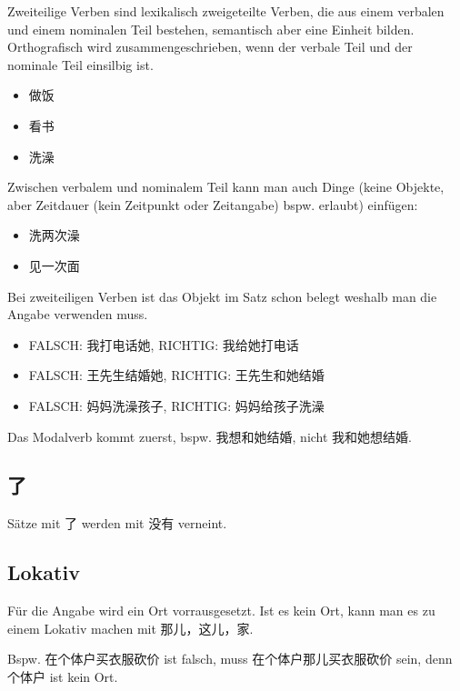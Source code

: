 \documentclass[UTF8]{ctexart}
\begin{document}
Zweiteilige Verben sind lexikalisch zweigeteilte Verben, die aus einem verbalen und einem nominalen Teil bestehen, semantisch aber eine Einheit bilden. Orthografisch wird zusammengeschrieben, wenn der verbale Teil und der nominale Teil
einsilbig ist.

\begin{itemize}
    \item 做饭
    \item 看书
    \item 洗澡
\end{itemize}

Zwischen verbalem und nominalem Teil kann man auch Dinge (keine Objekte, aber Zeitdauer (kein Zeitpunkt oder Zeitangabe) bspw. erlaubt) einfügen:

\begin{itemize}
    \item 洗两次澡
    \item 见一次面
\end{itemize}

Bei zweiteiligen Verben ist das Objekt im Satz schon belegt weshalb man die Angabe verwenden muss.

\begin{itemize}
    \item FALSCH: 我打电话她, RICHTIG: 我给她打电话
    \item FALSCH: 王先⽣结婚她, RICHTIG: 王先⽣和她结婚
    \item FALSCH: 妈妈洗澡孩⼦, RICHTIG: 妈妈给孩⼦洗澡
\end{itemize}

Das Modalverb kommt zuerst, bspw. 我想和她结婚, nicht 我和她想结婚.

\subsection{了}

Sätze mit 了 werden mit 没有 verneint.

\subsection{Lokativ}

Für die Angabe wird ein Ort vorrausgesetzt. Ist es kein Ort, kann man es zu einem Lokativ machen mit 那儿，这儿，家.

Bspw. 在个体户买衣服砍价 ist falsch, muss 在个体户那儿买衣服砍价 sein, denn 个体户 ist kein Ort.\\
\end{document}
